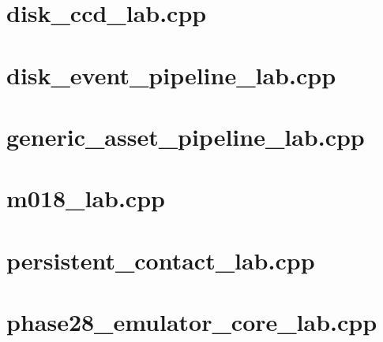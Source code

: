 \documentclass[11pt,twoside,openany]{book}
\begin{document}
\section*{disk\_ccd\_lab.cpp}
\hypertarget{source-file-ad26f703e8f150d27a72bf93}{}
\label{attachmentstart:source-file-ad26f703e8f150d27a72bf93}
\section*{disk\_event\_pipeline\_lab.cpp}
\hypertarget{source-file-a5db53514d74ae247b4ac42f}{}
\label{attachmentstart:source-file-a5db53514d74ae247b4ac42f}
\section*{generic\_asset\_pipeline\_lab.cpp}
\hypertarget{source-file-8aedc3fdcd10c91971507448}{}
\label{attachmentstart:source-file-8aedc3fdcd10c91971507448}
\section*{m018\_lab.cpp}
\hypertarget{source-file-44c320ffad9698c7abd453e2}{}
\label{attachmentstart:source-file-44c320ffad9698c7abd453e2}
\section*{persistent\_contact\_lab.cpp}
\hypertarget{source-file-552a9e2296dc984412c8f06d}{}
\label{attachmentstart:source-file-552a9e2296dc984412c8f06d}
\section*{phase28\_emulator\_core\_lab.cpp}
\hypertarget{source-file-0060a91bd24dd25d6c14e679}{}
\label{attachmentstart:source-file-0060a91bd24dd25d6c14e679}
\end{document}
